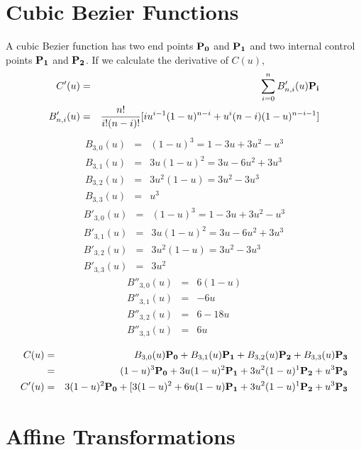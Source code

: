 \documentclass[11pt]{amsart}
\begin{document}
\section{Cubic Bezier Functions}
A cubic Bezier function has two end points $\bf P_0$ and $\bf P_1$ and two internal control points $\bf P_1$ and $\bf P_2$.  If we calculate the derivative of $C(u)$,
\begin{eqnarray}
C'(u) & = & \sum_{i=0}^n B'_{n,i}(u){\bf P_i} \\
B'_{n,i}(u) & = & \frac{n!}{i!(n-i)!}[iu^{i-1}(1-u)^{n-i} + u^{i}(n-i)(1-u)^{n-i-1}]
\end{eqnarray}
\begin{eqnarray}
B_{3,0}(u) & = & (1-u)^{3} = 1 - 3u + 3u^2 - u^3 \\
B_{3,1}(u) & = & 3 u(1-u)^2 = 3u - 6u^2 + 3u^3 \\
B_{3,2}(u) & = & 3 u^2(1-u) =  3u^2 -3u^3 \\
B_{3,3}(u) & = & u^3
\end{eqnarray}
\begin{eqnarray}
B'_{3,0}(u) & = & (1-u)^{3} = 1 - 3u + 3u^2 - u^3 \\
B'_{3,1}(u) & = & 3 u(1-u)^2 = 3u - 6u^2 + 3u^3 \\
B'_{3,2}(u) & = & 3 u^2(1-u) =  3u^2 -3u^3 \\
B'_{3,3}(u) & = & 3u^2
\end{eqnarray}
\begin{eqnarray}
B''_{3,0}(u) & = & 6(1-u) \\
B''_{3,1}(u) & = & -6u  \\
B''_{3,2}(u) & = & 6 - 18u \\
B''_{3,3}(u) & = & 6u
\end{eqnarray}



\begin{eqnarray}
C(u) & = & B_{3,0}(u){\bf P_0} + B_{3,1}(u){\bf P_1} + B_{3,2}(u){\bf P_2} + B_{3,3}(u){\bf P_3} \\
& = &(1-u)^3 {\bf P_0} + 3 u(1-u)^2 {\bf P_1} + 3 u^2(1-u)^1 {\bf P_2} + u^3 {\bf P_3} \\
C'(u) & = &3(1-u)^2 {\bf P_0} + [3(1-u)^2+6 u(1-u) {\bf P_1} + 3 u^2(1-u)^1 {\bf P_2} + u^3 {\bf P_3}
\end{eqnarray}



\section{Affine Transformations}
\end{document}
